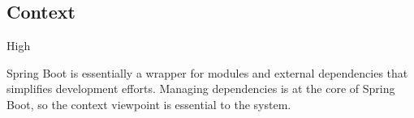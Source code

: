 \subsection*{Context}

\ranking High

Spring Boot is essentially a wrapper for modules and external dependencies that simplifies development efforts. Managing dependencies is at the core of Spring Boot, so the context viewpoint is essential to the system.